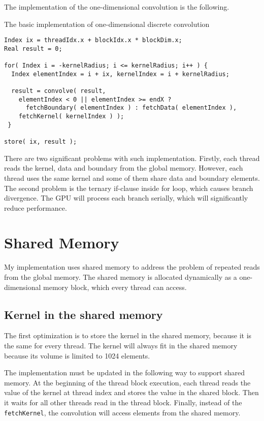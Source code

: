 The implementation of the one-dimensional convolution is the following.

\begin{listing}[!h]
\caption{The basic implementation of one-dimensional discrete convolution}
\begin{verbatim}
Index ix = threadIdx.x + blockIdx.x * blockDim.x;
Real result = 0;

for( Index i = -kernelRadius; i <= kernelRadius; i++ ) {
  Index elementIndex = i + ix, kernelIndex = i + kernelRadius;

  result = convolve( result,
    elementIndex < 0 || elementIndex >= endX ?
      fetchBoundary( elementIndex ) : fetchData( elementIndex ),
    fetchKernel( kernelIndex ) );
 }

store( ix, result );
\end{verbatim}
\label{lst:for-convolve}
\end{listing}

There are two significant problems with such implementation.
Firstly, each thread reads the kernel, data and boundary from the global memory.
However, each thread uses the same kernel and some of them share data and boundary elements.
The second problem is the ternary if-clause inside for loop, which causes branch divergence.
The GPU will process each branch serially, which will significantly reduce performance.

\section{Shared Memory}

My implementation uses shared memory to address the problem of repeated reads from the global memory.
The shared memory is allocated dynamically as a one-dimensional memory block, which every thread can access.

\subsection{Kernel in the shared memory}

The first optimization is to store the kernel in the shared memory, because it is the same for every thread.
The kernel will always fit in the shared memory because its volume is limited to 1024 elements.

The implementation must be updated in the following way to support shared memory.
At the beginning of the thread block execution, each thread reads the value of the kernel at thread index and stores the value in the shared block.
Then it waits for all other threads read in the thread block.
Finally, instead of the \texttt{fetchKernel}, the convolution will access elements from the shared memory.

